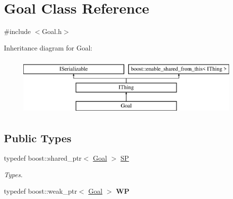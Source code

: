 \hypertarget{class_goal}{}\section{Goal Class Reference}
\label{class_goal}


{\ttfamily \#include $<$Goal.\+h$>$}

Inheritance diagram for Goal\+:\begin{figure}[H]
\begin{center}
\leavevmode
\includegraphics[height=3.000000cm]{class_goal}
\end{center}
\end{figure}
\subsection*{Public Types}
\begin{DoxyCompactItemize}
\item 
\mbox{\label{class_goal_a818ae12a4d1f28bd433dab2a830a390e}} 
typedef boost\+::shared\+\_\+ptr$<$ \hyperlink{class_goal}{Goal} $>$ \hyperlink{class_goal_a818ae12a4d1f28bd433dab2a830a390e}{SP}
\begin{DoxyCompactList}\small\item\em Types. \end{DoxyCompactList}\item 
\mbox{\label{class_goal_a2ed42e0bd1adf651fc2514b58af7ea4d}} 
typedef boost\+::weak\+\_\+ptr$<$ \hyperlink{class_goal}{Goal} $>$ {\bfseries WP}
\end{DoxyCompactItemize}
